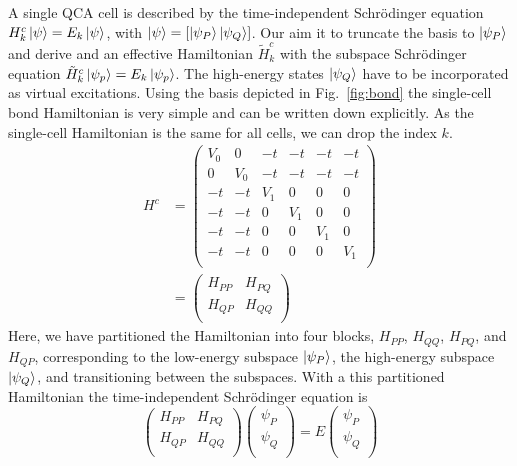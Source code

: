 A single QCA cell is described by the time-independent Schr\"odinger equation
$H^c_k \left|\psi\right> = E_k \left|\psi\right>$, with $\left|\psi\right> = \left[ \left|\psi_P\right>
\left|\psi_Q\right> \right]$. Our aim it to truncate the basis to $\left|\psi_P\right>$ and
derive and an effective Hamiltonian $\tilde{H}^c_k$ with the subspace
Schr\"odinger equation $\tilde{H}^c_k \left|\psi_p\right> = E_k \left|\psi_p\right>$. The
high-energy states $\left|\psi_Q\right>$ have to be incorporated as virtual
excitations.  Using the basis depicted in Fig.~\ref{fig:bond} the single-cell
bond Hamiltonian is very simple and can be written down explicitly. As the
single-cell Hamiltonian is the same for all cells, we can drop the index $k$.
%
\begin{equation}
\begin{split}
  \label{eq:H_marix}
  H^c
  &=
  \left(
  \begin{array}{cc|cccc}
    V_0 & 0   & -t  & -t  & -t  & -t  \\
    0   & V_0 & -t  & -t  & -t  & -t  \\
    \hline
    -t  & -t  & V_1 & 0   & 0   & 0   \\
    -t  & -t  & 0   & V_1 & 0   & 0   \\
    -t  & -t  & 0   & 0   & V_1 & 0   \\
    -t  & -t  & 0   & 0   & 0   & V_1 \\
  \end{array}
  \right) \\[1em]
  &=
  \left(
  \begin{array}{cc}
    H_{PP} & H_{PQ} \\
    H_{QP} & H_{QQ} \\
  \end{array}
  \right)
\end{split}
\end{equation}
%
Here, we have partitioned the Hamiltonian into four blocks, $H_{PP}$, $H_{QQ}$,
$H_{PQ}$, and $H_{QP}$, corresponding to the low-energy subspace $\left|\psi_P\right>$,
the high-energy subspace $\left|\psi_Q\right>$, and transitioning between the subspaces.
With a this partitioned Hamiltonian the time-independent Schr\"odinger equation
is
%
\begin{equation}
  \label{eq:SE}
  \begin{pmatrix}
    H_{PP} & H_{PQ} \\
    H_{QP} & H_{QQ} \\
  \end{pmatrix}
  \begin{pmatrix}
    \psi_P \\
    \psi_Q \\
  \end{pmatrix}
  =
  E
  \begin{pmatrix}
    \psi_P \\
    \psi_Q \\
  \end{pmatrix}
\end{equation}
